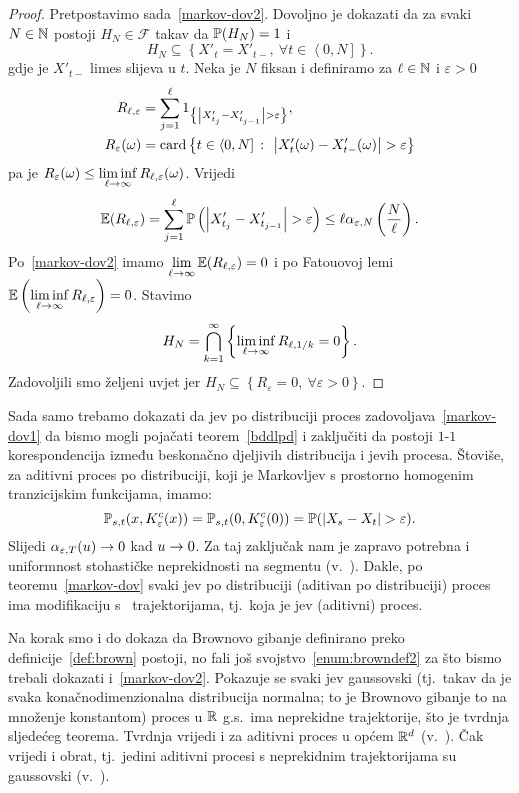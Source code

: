 \documentclass[main.tex]{subfiles}
\begin{document}
\begin{proof}
	Pretpostavimo sada~\eqref{markov-dov2}. Dovoljno je dokazati da za svaki \( N \in \N \)
	postoji \( H_N \in \mathcal F \) takav da \( \P(H_N)=1 \) i
	\[
		H_N \subseteq \left\{ X'_t = X'_{t-}, \ \forall t \in \left\langle 0,N \right] \right\}.
	\]
	gdje je \( X'_{t-} \) limes slijeva u \( t \). Neka je \( N \) fiksan i definiramo za \( \ell \in \N \) i \( \varepsilon > 0 \)
	\begin{align}
		R_{\ell, \varepsilon}   & = \sum_{j=1}^\ell 1_{\left\{ \abs{X'_{t_j}-X'_{t_{j-1}}} > \varepsilon \right\}},                           \\
		R_{\varepsilon}(\omega) & = \card \left\{ t \in \left\langle0, N\right] \st \abs{X'_t(\omega)-X'_{t-}(\omega)} > \varepsilon \right\}
	\end{align}
	pa je \( R_\varepsilon(\omega) \le \liminf\limits_{\ell \ub} R_{\ell, \varepsilon}(\omega) \). Vrijedi
	\begin{equation}
		\E(R_{\ell, \varepsilon}) =
		\sum_{j=1}^\ell \P\left(\abs{X'_{t_j} - X'_{t_{j-1}}} > \varepsilon\right) \le \ell \alpha_{\varepsilon, N}\left( \frac N\ell \right).
	\end{equation}
	Po~\eqref{markov-dov2} imamo \( \lim\limits_{\ell \ub} \E(R_{\ell, \varepsilon}) = 0 \) i po Fatouovoj lemi \( \E\left(\liminf\limits_{\ell \ub} R_{\ell, \varepsilon}\right) = 0 \). Stavimo
	\[
		H_N = \bigcap_{k=1}^\infty \left\{ \liminf\limits_{\ell \ub} R_{\ell, 1/k} = 0 \right\}.
	\]
	Zadovoljili smo željeni uvjet jer \( H_N \subseteq \left\{ R_\varepsilon = 0, \ \forall \varepsilon > 0 \right\} \).
\end{proof}
\bigskip
Sada samo trebamo dokazati da \levy jev po distribuciji proces zadovoljava~\eqref{markov-dov1} da
bismo mogli pojačati teorem~\ref{bddlpd} i zaključiti da postoji \( 1 \)-\( 1 \)
korespondencija između beskonačno djeljivih distribucija i \levy jevih procesa. Štoviše, za aditivni
proces po distribuciji, koji je Markovljev s prostorno homogenim tranzicijskim funkcijama, imamo:
\[
	\Ptrans_{s, t}(x, K_\varepsilon^c(x)) = \Ptrans_{s, t}(0, K_\varepsilon^c(0)) = \P(\abs{X_s-X_t} > \varepsilon).
\]
Slijedi \( \alpha_{\varepsilon, T}(u) \un \) kad \( u \un \). Za taj zaključak nam je zapravo
potrebna i uniformnost stohastičke neprekidnosti na segmentu (v.~\cite[lema~9.6]{sato}). Dakle, po
teoremu~\ref{markov-dov} svaki \levy jev po distribuciji (aditivan po distribuciji)
proces ima modifikaciju s \cadlag \ trajektorijama, tj.\ koja je \levy jev (aditivni) proces.

Na korak smo i do dokaza da Brownovo gibanje definirano preko definicije~\ref{def:brown} postoji, no fali još svojstvo~\ref{enum:browndef2} za što bismo trebali dokazati
i~\eqref{markov-dov2}. Pokazuje se svaki \levy jev gaussovski (tj.\ takav da
je svaka konačnodimenzionalna distribucija normalna; to je Brownovo gibanje to na množenje konstantom) proces u \( \R \) g.s.\ ima neprekidne trajektorije,
što je tvrdnja sljedećeg teorema. Tvrdnja vrijedi i za aditivni proces u općem \( \R^d \) (v.~\cite[tm.~11.7]{sato}). Čak vrijedi i obrat, tj.\ jedini aditivni procesi s neprekidnim trajektorijama su gaussovski (v.~\cite[]{sato}).
\end{document}
